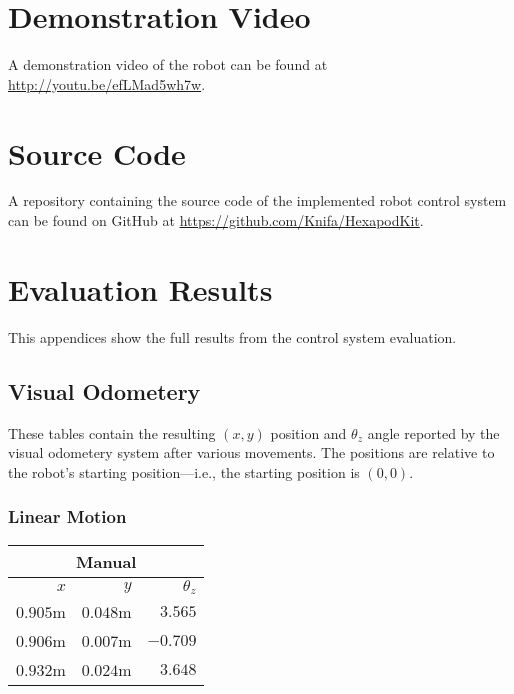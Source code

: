 \begin{appendices}

\chapter{Demonstration Video}

A demonstration video of the robot can be found at \url{http://youtu.be/efLMad5wh7w}.

\chapter{Source Code}

A repository containing the source code of the implemented robot control system can be found on GitHub at \url{https://github.com/Knifa/HexapodKit}.

\chapter{Evaluation Results}

This appendices show the full results from the control system evaluation.

\section{Visual Odometery}

These tables contain the resulting $(x, y)$ position and $\theta_z$ angle reported by the visual odometery system after various movements. The positions are relative to the robot's starting position---i.e., the starting position is $(0, 0)$.

\subsection{Linear Motion}

\begin{table}[!h]
	\centering
	\begin{tabular}{ r r r }
		\toprule
		\multicolumn{3}{c}{\textbf{Manual}} \\
		\midrule
		\textbf{$x$} & \textbf{$y$} & \textbf{$\theta_z$} \\
		\midrule
		$0.905$m &
		$0.048$m &
		$3.565$\textdegree{} \\

		$0.906$m &
		$0.007$m &
		$-0.709$\textdegree{} \\

		$0.932$m &
		$0.024$m &
		$3.648$\textdegree{} \\


\end{tabular}
\end{table}
\end{appendices}
